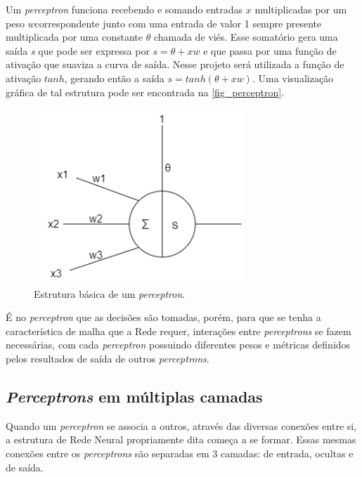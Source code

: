 Um \textit{perceptron} funciona recebendo e somando entradas \(x\) multiplicadas por 
um peso \(w\)correspondente junto com uma entrada de valor 1 sempre presente 
multiplicada por uma constante \(\theta\) chamada de viés. Esse somatório gera uma saída 
\textit{s} que pode ser expressa por \(s = \theta + xw\) e que passa por uma função de ativação 
que suaviza a curva de saída. Nesse projeto será utilizada a função de ativação 
\(tanh\), gerando então a saída \(s = tanh( \theta + xw)\). Uma visualização gráfica de tal 
estrutura pode ser encontrada na \autoref{fig_perceptron}.

\begin{figure}[htb]
        \centering
        \caption{\label{fig_perceptron}Estrutura b{\'a}sica de um \textit{perceptron}.}
        \includegraphics[width=0.7\textwidth]{images/Perceptron.png}
\end{figure}

{\'E} no \textit{perceptron} que as decisões são tomadas, porém, para que se tenha a 
característica de malha que a Rede requer, interações entre \textit{perceptrons} se fazem 
necessárias, com cada \textit{perceptron} possuindo diferentes pesos e métricas definidos 
pelos resultados de saída de outros \textit{perceptrons}.

\subsection{\textit{Perceptrons} em m{\'u}ltiplas camadas}

Quando um \textit{perceptron} se associa a outros, através das diversas conexões 
entre si, a estrutura de Rede Neural propriamente dita começa a se formar. Essas 
mesmas conexões entre os \textit{perceptrons} são separadas em 3 camadas: de entrada, 
ocultas e de saída.

